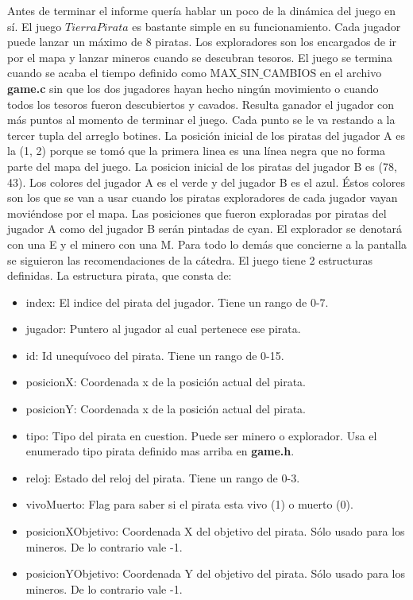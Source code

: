Antes de terminar el informe quería hablar un poco de la dinámica del juego en sí.
El juego $Tierra Pirata$ es bastante simple en su funcionamiento. Cada jugador puede lanzar un máximo de 8 piratas. Los exploradores son los encargados de ir por el mapa y lanzar mineros cuando se descubran tesoros. El juego se termina cuando se acaba el tiempo definido como MAX$\_$SIN$\_$CAMBIOS en el archivo \textbf{game.c} sin que los dos jugadores hayan hecho ningún movimiento o cuando todos los tesoros fueron descubiertos y cavados. Resulta ganador el jugador con más puntos al momento de terminar el juego. Cada punto se le va restando a la tercer tupla del arreglo botines.
La posición inicial de los piratas del jugador A es la (1, 2) porque se tomó que la primera linea es una línea negra que no forma parte del mapa del juego. La posicion inicial de los piratas del jugador B es (78, 43). Los colores del jugador A es el verde y del jugador B es el azul. Éstos colores son los que se van a usar cuando los piratas exploradores de cada jugador vayan moviéndose por el mapa. Las posiciones que fueron exploradas por piratas del jugador A como del jugador B serán pintadas de cyan. El explorador se denotará con una E y el minero con una M. Para todo lo demás que concierne a la pantalla se siguieron las recomendaciones de la cátedra.
\newline
\newline
El juego tiene 2 estructuras definidas.
La estructura pirata, que consta de: 
\begin{itemize}
\item index: El indice del pirata del jugador. Tiene un rango de 0-7.
\item jugador: Puntero al jugador al cual pertenece ese pirata.
\item id: Id unequívoco del pirata. Tiene un rango de 0-15.
\item posicionX: Coordenada x de la posición actual del pirata. 
\item posicionY: Coordenada x de la posición actual del pirata. 
\item tipo: Tipo del pirata en cuestion. Puede ser minero o explorador. Usa el enumerado tipo pirata definido mas arriba en \textbf{game.h}.
\item reloj: Estado del reloj del pirata. Tiene un rango de 0-3.
\item vivoMuerto: Flag para saber si el pirata esta vivo (1) o muerto (0).
\item posicionXObjetivo: Coordenada X del objetivo del pirata. Sólo usado para los mineros. De lo contrario vale -1.
\item posicionYObjetivo: Coordenada Y del objetivo del pirata. Sólo usado para los mineros. De lo contrario vale -1.
\end{itemize}
